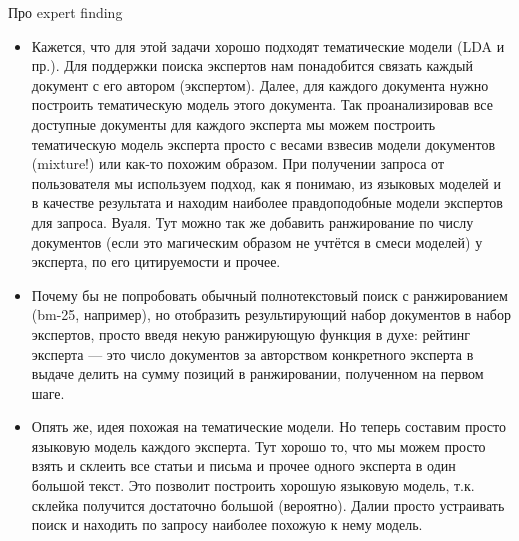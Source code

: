 \begin{task}[6]
Про expert finding
\end{task}
\begin{solution}
\begin{itemize}
	\item Кажется, что для этой задачи хорошо подходят тематические модели (LDA и пр.). Для поддержки поиска экспертов нам понадобится связать каждый документ с его автором (экспертом). Далее, для каждого документа нужно построить тематическую модель этого документа. Так проанализировав все доступные документы для каждого эксперта мы можем построить тематическую модель эксперта просто с весами взвесив модели документов (mixture!) или как-то похожим образом. При получении запроса от пользователя мы используем подход, как я понимаю, из языковых моделей и в качестве результата и находим наиболее правдоподобные модели экспертов для запроса. Вуаля. Тут можно так же добавить ранжирование по числу документов (если это магическим образом не учтётся в смеси моделей) у эксперта, по его цитируемости и прочее.
	\item Почему бы не попробовать обычный полнотекстовый поиск с ранжированием (bm-25, например), но отобразить результирующий набор документов в набор экспертов, просто введя некую ранжирующую функция в духе: рейтинг эксперта --- это число документов за авторством конкретного эксперта в выдаче делить на сумму позиций в ранжировании, полученном на первом шаге.
	\item Опять же, идея похожая на тематические модели. Но теперь составим просто языковую модель каждого эксперта. Тут хорошо то, что мы можем просто взять и склеить все статьи и письма и прочее одного эксперта в один большой текст. Это позволит построить хорошую языковую модель, т.к. склейка получится достаточно большой (вероятно). Далии просто устраивать поиск и находить по запросу наиболее похожую к нему модель.
\end{itemize}
\end{solution}

